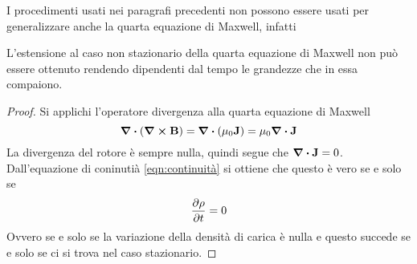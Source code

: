 I procedimenti usati nei paragrafi precedenti non possono essere usati per generalizzare anche la quarta equazione di Maxwell, infatti

\begin{obs}
    L'estensione al caso non stazionario della quarta equazione di Maxwell non può essere
    ottenuto rendendo dipendenti dal tempo le grandezze che in essa compaiono.
\end{obs}
\begin{proof}
    Si applichi l'operatore divergenza alla quarta equazione di Maxwell
    \[
        \div(\curl{\vb{B}})=\div(\mu_0\vb{J})=\mu_0\div{\vb{J}}
    \]
    La divergenza del rotore è sempre nulla, quindi segue che $\div{\vb{J}}=0$.
    Dall'equazione di coninutià \eqref{eqn:continuità} si ottiene che questo è vero se e solo se
    \[
        \pdv{\rho}{t}=0
    \]
    Ovvero se e solo se la variazione della densità di carica è nulla
    e questo succede se e solo se ci si trova nel caso stazionario.
\end{proof}

